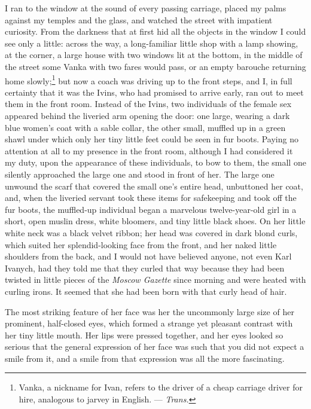 I ran to the window at the sound of every passing carriage, placed my palms against my temples and the glass, and watched the street with impatient curiosity. From the darkness that at first hid all the objects in the window I could see only a little: across the way, a long-familiar little shop with a lamp showing, at the corner, a large house with two windows lit at the bottom, in the middle of the street some Vanka with two fares would pass, or an empty barouche returning home slowly;\footnote{Vanka, a nickname for Ivan, refers to the driver of a cheap carriage driver for hire, analogous to jarvey in English. --- \textit{Trans.}} but now a coach was driving up to the front steps, and I, in full certainty that it was the Ivins, who had promised to arrive early, ran out to meet them in the front room. Instead of the Ivins, two individuals of the female sex appeared behind the liveried arm opening the door: one large, wearing a dark blue women's coat with a sable collar, the other small, muffled up in a green shawl under which only her tiny little feet could be seen in fur boots. Paying no attention at all to my presence in the front room, although I had considered it my duty, upon the appearance of these individuals, to bow to them, the small one silently approached the large one and stood in front of her. The large one unwound the scarf that covered the small one's entire head, unbuttoned her coat, and, when the liveried servant took these items for safekeeping and took off the fur boots, the muffled-up individual began a marvelous twelve-year-old girl in a short, open muslin dress, white bloomers, and tiny little black shoes. On her little white neck was a black velvet ribbon; her head was covered in dark blond curls, which suited her splendid-looking face from the front, and her naked little shoulders from the back, and I would not have believed anyone, not even Karl Ivanych, had they told me that they curled that way because they had been twisted in little pieces of the \textit{Moscow Gazette} since morning and were heated with curling irons. It seemed that she had been born with that curly head of hair.

The most striking feature of her face was her the uncommonly large size of her prominent, half-closed eyes, which formed a strange yet pleasant contrast with her tiny little mouth. Her lips were pressed together, and her eyes looked so serious that the general expression of her face was such that you did not expect a smile from it, and a smile from that expression was all the more fascinating.

